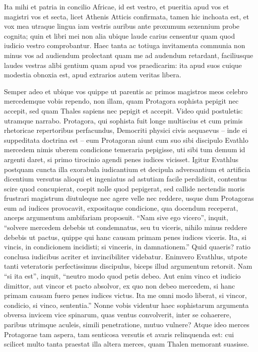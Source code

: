 Ita mihi et patria in concilio Africae, id est vestro, et pueritia apud vos et magistri vos et secta, licet Athenis Atticis confirmata, tamen hic inchoata est, et vox mea utraque lingua iam vestris auribus ante proxumum sexennium probe cognita; quin et libri mei non alia ubique laude carius censentur quam quod iudicio vestro comprobantur. Haec tanta ac totiuga invitamenta communia non minus vos ad audiendum prolectant quam me ad audendum retardant, faciliusque laudes vestras alibi gentium quam apud vos praedicarim: ita apud suos cuique modestia obnoxia est, apud extrarios autem veritas libera. 

Semper adeo et ubique vos quippe ut parentis ac primos magistros meos celebro mercedemque vobis rependo, non illam, quam Protagora sophista pepigit nec accepit, sed quam Thales sapiens nec pepigit et accepit. Video quid postuletis: utramque narrabo. Protagora, qui sophista fuit longe multiscius et cum primis rhetoricae repertoribus perfacundus, Democriti physici civis aequaevus – inde ei suppeditata doctrina est – eum Protagoran aiunt cum suo sibi discipulo Evathlo mercedem nimis uberem condicione temeraria pepigisse, uti sibi tum demum id argenti daret, si primo tirocinio agendi penes iudices vicisset. Igitur Evathlus postquam cuncta illa exorabula iudicantium et decipula adversantium et artificia dicentium versutus alioqui et ingeniatus ad astutiam facile perdidicit, contentus scire quod concupierat, coepit nolle quod pepigerat, sed callide nectendis moris frustrari magistrum diutuleque nec agere velle nec reddere, usque dum Protagoras eum ad iudices provocavit, expositaque condicione, qua docendum receperat, anceps argumentum ambifariam proposuit. ``Nam sive ego vicero'', inquit, ``solvere mercedem debebis ut condemnatus, seu tu viceris, nihilo minus reddere debebis ut pactus, quippe qui hanc causam primam penes iudices viceris. Ita, si vincis, in condicionem incidisti; si vinceris, in damnationem.'' Quid quaeris? ratio conclusa iudicibus acriter et invincibiliter videbatur. Enimvero Evathlus, utpote tanti veteratoris perfectissimus discipulus, biceps illud argumentum retorsit. Nam ``si ita est'', inquit, ``neutro modo quod petis debeo. Aut enim vinco et iudicio dimittor, aut vincor et pacto absolvor, ex quo non debeo mercedem, si hanc primam causam fuero penes iudices victus. Ita me omni modo liberat, si vincor, condicio, si vinco, sententia.'' Nonne vobis videntur haec sophistarum argumenta obversa invicem vice spinarum, quas ventus convolverit, inter se cohaerere, paribus utrimque aculeis, simili penetratione, mutuo vulnere? Atque ideo merces Protagorae tam aspera, tam senticosa versutis et avaris relinquenda est: cui scilicet multo tanta praestat illa altera merces, quam Thalen memorant suasisse. 

